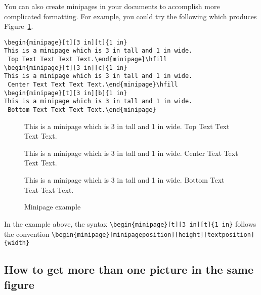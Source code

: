 You can also create minipages in your documents to accomplish more complicated formatting. For example, you could try the following which produces Figure~\ref{Fig2}.
\begin{singlespace}\small
\begin{verbatim}
\begin{minipage}[t][3 in][t]{1 in}
This is a minipage which is 3 in tall and 1 in wide.
 Top Text Text Text Text.\end{minipage}\hfill
\begin{minipage}[t][3 in][c]{1 in}
This is a minipage which is 3 in tall and 1 in wide.
 Center Text Text Text Text.\end{minipage}\hfill
\begin{minipage}[t][3 in][b]{1 in}
This is a minipage which is 3 in tall and 1 in wide.
 Bottom Text Text Text Text.\end{minipage}
\end{verbatim}
\end{singlespace}

\begin{figure}[!htb]
\begin{minipage}[t][3 in][t]{1 in}
This is a minipage which is 3 in tall and 1 in wide. Top Text Text Text Text.
\end{minipage}
\hfill
\begin{minipage}[t][3 in][c]{1 in} This is a minipage which is 3 in tall and 1 in wide. Center Text Text Text Text.
\end{minipage}
\hfill
\begin{minipage}[t][3 in][b]{1 in}
This is a minipage which is 3 in tall and 1 in wide. Bottom Text Text Text Text.
\end{minipage}
\caption{Minipage example}\label{Fig2}
\end{figure}

In the example above, the syntax \verb|\begin{minipage}[t][3 in][t]{1 in}| follows the convention \linebreak\verb|\begin{minipage}[minipageposition][height][textposition]{width}|

\subsection[Two pictures in one figure]{How to get more than one picture in the same figure}


